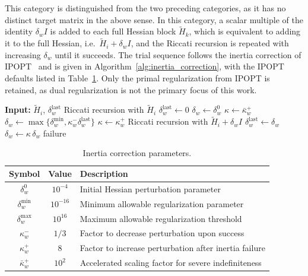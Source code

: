 \documentclass[class=scrbook, crop=false]{standalone}
\begin{document}
This category is distinguished from the two preceding categories, as it has no distinct target matrix in the above sense.
In this category, a scalar multiple of the identity $\delta_w I$ is added to each full Hessian block $\tilde{H}_k$, 
which is equivalent to adding it to the full Hessian, i.e.\ $\tilde{H}_i + \delta_w I$,
and the Riccati recursion is repeated with increasing $\delta_w$ until it succeeds.
The trial sequence follows the inertia correction of IPOPT~\cite{wachter2006implementation}
and is given in Algorithm~\ref{alg:inertia_correction}, with the IPOPT defaults listed in Table~\ref{tab:inertia_correction}.
Only the primal regularization from IPOPT is retained, as dual regularization is not the primary focus of this work.

\begin{algorithm}[htbp]
\caption{\textsf{INERTIA\_LM}, following IPOPT~\cite{wachter2006implementation}}
\label{alg:inertia_correction}
\begin{algorithmic}[1]
\State\textbf{Input:} $\tilde{H}_i$, $\delta_w^{\mathrm{last}}$
\Statex
\State Riccati recursion with $\tilde{H}_i$
    \State $\delta_w^{\mathrm{last}} \gets 0$
    \State \Return
\EndIf
{}
    \State $\delta_w \gets \delta_w^0$ 
    \State $\kappa \gets \bar{\kappa}_w^+$
\Else
    \State $\delta_w \gets \max\{\delta_w^{\min}, \kappa_w^- \delta_w^{\mathrm{last}}\}$ 
    \State $\kappa \gets \kappa_w^+$
\EndIf
{}
    \State Riccati recursion with $\tilde{H}_i + \delta_w I$
        \State $\delta_w^{\mathrm{last}} \gets \delta_w$
        \State \Return
    \EndIf
    \State $\delta_w \gets \kappa\, \delta_w$
\EndWhile
\State \Return failure
\end{algorithmic}
\end{algorithm}

\begin{table}[htbp]
  \centering
  \caption{Inertia correction parameters.}
  \label{tab:inertia_correction}
  \vspace{0.5em}
  \begin{tabular}{ccp{10cm}}
    \toprule
    \textbf{Symbol} & \textbf{Value} & \textbf{Description} \\
    \midrule
    $\delta_w^0$        & $10^{-4}$  & Initial Hessian perturbation parameter \\
    $\delta_w^{\min}$   & $10^{-16}$ & Minimum allowable regularization parameter \\
    $\delta_w^{\max}$   & $10^{16}$  & Maximum allowable regularization threshold \\
    $\kappa_w^-$        & $1/3$      & Factor to decrease perturbation upon success \\
    $\kappa_w^+$        & $8$        & Factor to increase perturbation after inertia failure \\
    $\bar{\kappa}_w^+$  & $10^2$     & Accelerated scaling factor for severe indefiniteness \\
    \bottomrule
  \end{tabular}
\end{table}
\end{document}
